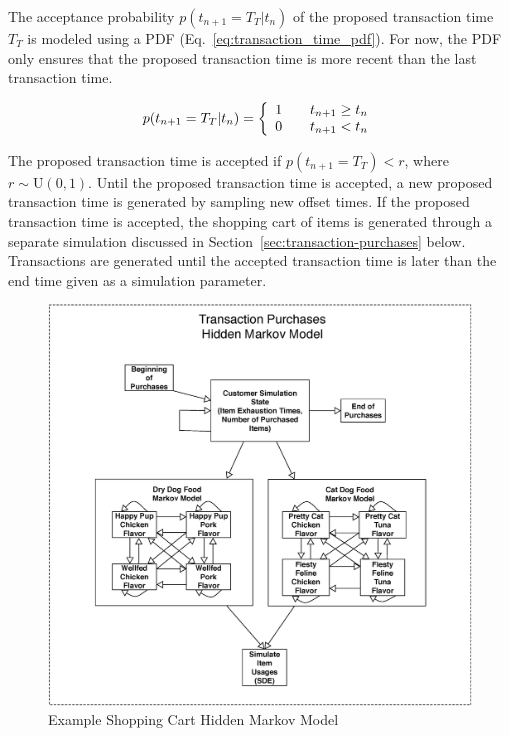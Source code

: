 \documentclass[conference]{IEEEtran}
\begin{document}
The acceptance probability $p(t_{n+1}=T_T|t_n)$ of the proposed transaction time $T_T$ is modeled using a PDF (Eq.~\ref{eq:transaction_time_pdf}). For now, the PDF only ensures that the proposed transaction time is more recent than the last transaction time.


\begin{equation} \label{eq:transaction_time_pdf}
p(t_{n+1}=T_T|t_n) = \left\{ 
  \begin{array}{l l}
   1 & \quad t_{n+1} \geq t_n\\
   0 & \quad t_{n+1} < t_n
  \end{array} \right.
\end{equation}

The proposed transaction time is accepted if $p(t_{n+1}=T_T) < r$, where $r \sim \text{U}(0, 1)$. Until the proposed transaction time is accepted, a new proposed transaction time is generated by sampling new offset times. If the proposed transaction time is accepted, the shopping cart of items is generated through a separate simulation discussed in Section~\ref{sec:transaction-purchases} below. Transactions are generated until the accepted transaction time is later than the end time given as a simulation parameter.

\begin{figure}[!t]
  \centering
  \includegraphics[width=6in]{figures/shopping_cart_simulation.eps}
  \caption{Example Shopping Cart Hidden Markov Model}
  \label{fig:shopping_cart_sim}
\end{figure}
\end{document}
